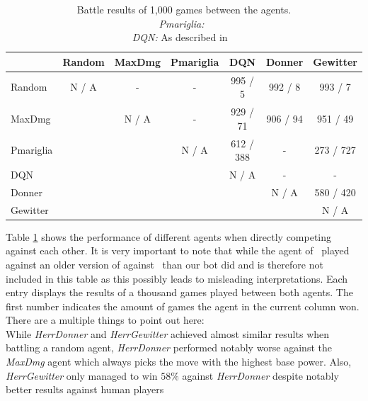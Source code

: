 \begin{table}[h]
  \centering
  \begin{tabular}{|l|c|c|c|c|c|c|}
    \hline
     & Random & MaxDmg & Pmariglia & DQN & Donner   & Gewitter  \\
    \hline
    Random                                         & N / A  & -      & -         & 995 / 5   & 992 / 8  & 993 / 7   \\
    \hline
    MaxDmg                                         &        & N / A  & -         & 929 / 71  & 906 / 94 & 951 / 49  \\
    \hline
    Pmariglia                                      &        &        & N / A     & 612 / 388  & -        & 273 / 727 \\
    \hline
    DQN                                            &        &        &           & N / A     & -        & -         \\
    \hline
    Donner                                         &        &        &           &           & N / A    & 580 / 420 \\
    \hline
    Gewitter                                       &        &        &           &           &          & N / A     \\                            
    \hline
    \end{tabular}
    \caption{Battle results of 1,000 games between the agents. \\
    \emph{Pmariglia:}~\autocite{Github:pmariglia-showdown} \\
    \emph{DQN:} As described  in ~\autocite{Huang_Lee_2019}}
    \label{tab:agent-performance}
  \end{table}
Table \ref{tab:agent-performance} shows the performance of different agents when directly competing against each other.
It is very important to note that while the agent of~\autocite{Huang_Lee_2019} played against an older version of
against~\autocite*{Github:pmariglia-showdown} than our bot did and is therefore not included in this table as 
this possibly leads to misleading interpretations. 
Each entry displays the results of a thousand games played between both agents. The first number indicates the amount
of games the agent in the current column won. There are a multiple things to point out here: \\
While \textit{HerrDonner} and \textit{HerrGewitter} achieved almost similar results when battling a random agent, 
\textit{HerrDonner} performed notably worse against the \textit{MaxDmg} agent which always picks the move with the
highest base power. Also, \textit{HerrGewitter} only managed to win $58\%$ against \textit{HerrDonner} despite notably
better results against human players 

